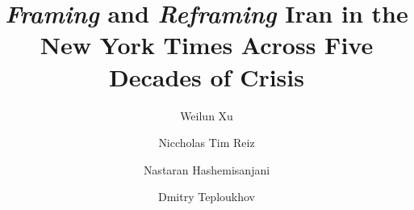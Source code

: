 \documentclass{dhnbpub}
\begin{document}

\title{\textit{Framing} and \textit{Reframing} Iran in the New York Times Across Five Decades of Crisis}


\author{Weilun Xu}
\author{Niccholas Tim Reiz}
\author{Nastaran Hashemisanjani}
\author{Dmitry Teploukhov}
\address{EPFL, Lausanne, Switzerland}



\maketitle
\end{document}
